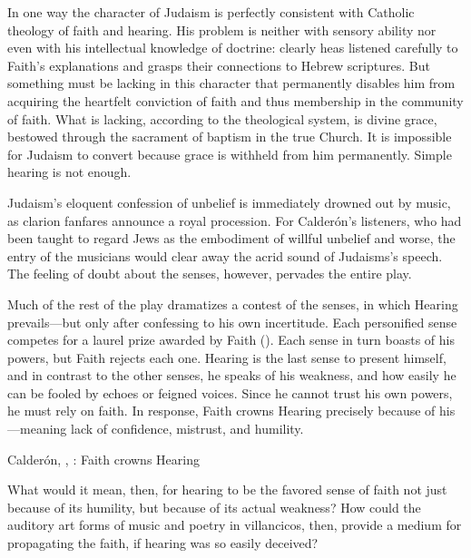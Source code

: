 In one way the character of Judaism is perfectly consistent with Catholic 
theology of faith and hearing.
His problem is neither with sensory ability nor even with his intellectual 
knowledge of doctrine: clearly heas listened carefully to Faith's explanations 
and grasps their connections to Hebrew scriptures.
But something must be lacking in this character that permanently disables him 
from acquiring the heartfelt conviction of faith and thus membership in the 
community of faith.
What is lacking, according to the theological system, is divine grace, bestowed 
through the sacrament of baptism in the true Church.
It is impossible for Judaism to convert because grace is withheld from him 
permanently.
Simple hearing is not enough.

Judaism's eloquent confession of unbelief is immediately drowned out by music, 
as clarion fanfares announce a royal procession.
For Calderón's listeners, who had been taught to regard Jews as the embodiment 
of willful unbelief and worse, the entry of the musicians would clear away the 
acrid sound of Judaisms's speech.
The feeling of doubt about the senses, however, pervades the entire play.

Much of the rest of the play dramatizes a contest of the senses, in which 
Hearing prevails---but only after confessing to his own incertitude.
Each personified sense competes for a laurel prize awarded by Faith 
().
Each sense in turn boasts of his powers, but Faith rejects each one.
Hearing is the last sense to present himself, and in contrast to the other 
senses, he speaks of his weakness, and how easily he can be fooled by echoes or 
feigned voices.
Since he cannot trust his own powers, he must rely on faith.
In response, Faith crowns Hearing precisely because of his 
---meaning lack of confidence, mistrust, and humility.

\begin{expoem}
    \caption{Calderón, , : 
    Faith crowns Hearing}
    \label{expoem:Calderon-Retiro-Hearing}
\end{expoem}

What would it mean, then, for hearing to be the favored sense of faith not just 
because of its humility, but because of its actual weakness?
How could the auditory art forms of music and poetry in villancicos, then, 
provide a medium for propagating the faith, if hearing was so easily deceived?

